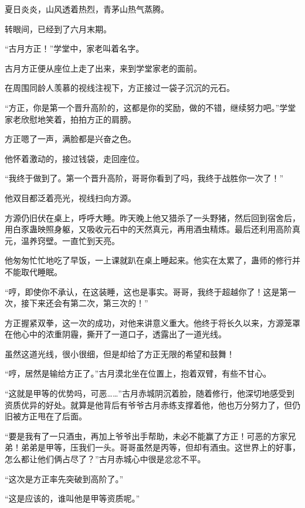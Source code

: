 
\begin{this_body}



夏日炎炎，山风透着热烈，青茅山热气蒸腾。

转眼间，已经到了六月末期。

“古月方正！”学堂中，家老叫着名字。

古月方正便从座位上走了出来，来到学堂家老的面前。

在周围同龄人羡慕的视线注视下，方正接过一袋子沉沉的元石。

“方正，你是第一个晋升高阶的，这都是你的奖励，做的不错，继续努力吧。”学堂家老欣慰地笑着，拍拍方正的肩膀。

方正嗯了一声，满脸都是兴奋之色。

他怀着激动的，接过钱袋，走回座位。

“我终于做到了。第一个晋升高阶，哥哥你看到了吗，我终于战胜你一次了！”

他双目都泛着亮光，视线扫向方源。

方源仍旧伏在桌上，呼呼大睡。昨天晚上他又猎杀了一头野猪，然后回到宿舍后，用白豕蛊映照身躯，又吸收元石中的天然真元，再用酒虫精炼。最后还利用高阶真元，温养窍壁。一直忙到天亮。

他匆匆忙忙地吃了早饭，一上课就趴在桌上睡起来。他实在太累了，蛊师的修行并不能取代睡眠。

“哼，即使你不承认，在这装睡，这也是事实。哥哥，我终于超越你了！这是第一次，接下来还会有第二次，第三次的！”

方正握紧双拳，这一次的成功，对他来讲意义重大。他终于将长久以来，方源笼罩在他心中的浓重阴霾，撕开了一道口子，透露出了一道光线。

虽然这道光线，很小很细，但是却给了方正无限的希望和鼓舞！

“哼，居然是输给方正了。”古月漠北坐在位置上，抱着双臂，有些不甘心。

“这就是甲等的优势吗，可恶……”古月赤城阴沉着脸，随着修行，他深切地感受到资质优异的好处。就算是他背后有爷爷古月赤练支撑着他，他也万分努力了，但仍旧被方正甩在了后面。

“要是我有了一只酒虫，再加上爷爷出手帮助，未必不能赢了方正！可恶的方家兄弟！弟弟是甲等，压我们一头。哥哥虽然是丙等，但却有酒虫。这世界上的好事，怎么都让他们俩占尽了？”古月赤城心中很是忿忿不平。

“这次是方正率先突破到高阶了。”

“这是应该的，谁叫他是甲等资质呢。”


\end{this_body}
